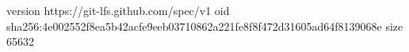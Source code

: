 version https://git-lfs.github.com/spec/v1
oid sha256:4e002552f8ea5b42acfe9eeb03710862a221fe8f8f472d31605ad64f8139068e
size 65632
